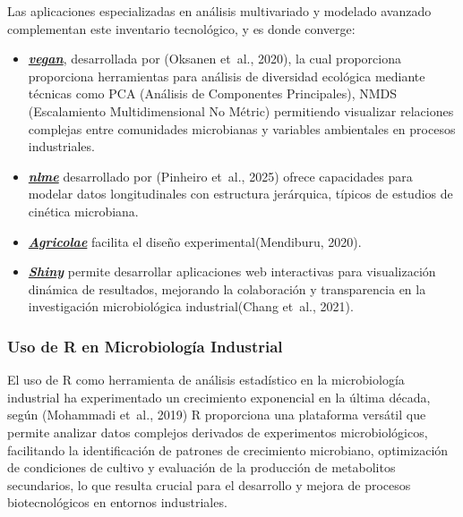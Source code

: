 \documentclass[
  spanish,
  letterpaper,
  DIV=11,
  numbers=noendperiod]{scrreprt}
\begin{document}
Las aplicaciones especializadas en análisis multivariado y modelado
avanzado complementan este inventario tecnológico, y es donde converge:

\begin{itemize}
\item
  \href{https://cran.r-project.org/web/packages/vegan/index.html}{\textbf{\emph{vegan}}},
  desarrollada por (Oksanen et~al., 2020), la cual proporciona
  proporciona herramientas para análisis de diversidad ecológica
  mediante técnicas como PCA (Análisis de Componentes Principales), NMDS
  (Escalamiento Multidimensional No Métric) permitiendo visualizar
  relaciones complejas entre comunidades microbianas y variables
  ambientales en procesos industriales.
\item
  \href{https://fhernanb.github.io/libro_modelos_mixtos/pac-nlme.html}{\textbf{\emph{nlme}}}
  desarrollado por (Pinheiro et~al., 2025) ofrece capacidades para
  modelar datos longitudinales con estructura jerárquica, típicos de
  estudios de cinética microbiana.
\item
  \href{https://cran.r-project.org/web/packages/agricolae/index.html}{\textbf{\emph{Agricolae}}}
  facilita el diseño experimental(Mendiburu, 2020).
\item
  \href{https://shiny.posit.co/r/getstarted/shiny-basics/lesson1/}{\textbf{\emph{Shiny}}}
  permite desarrollar aplicaciones web interactivas para visualización
  dinámica de resultados, mejorando la colaboración y transparencia en
  la investigación microbiológica industrial(Chang et~al., 2021).
\end{itemize}

\subsubsection{Uso de R en Microbiología
Industrial}\label{uso-de-r-en-microbiologuxeda-industrial}

El uso de R como herramienta de análisis estadístico en la microbiología
industrial ha experimentado un crecimiento exponencial en la última
década, según (Mohammadi et~al., 2019) R proporciona una plataforma
versátil que permite analizar datos complejos derivados de experimentos
microbiológicos, facilitando la identificación de patrones de
crecimiento microbiano, optimización de condiciones de cultivo y
evaluación de la producción de metabolitos secundarios, lo que resulta
crucial para el desarrollo y mejora de procesos biotecnológicos en
entornos industriales.
\end{document}
